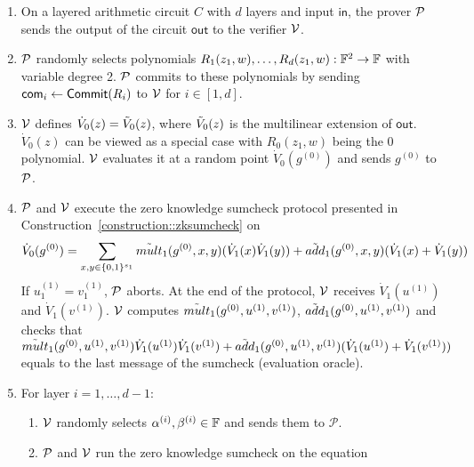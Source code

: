 \begin{mdframed}[nobreak=false]
	\begin{construction}\label{construction:zkgkr}
		\begin{enumerate} 
			\item On a layered arithmetic circuit $C$ with $d$ layers and input $\mathsf{in}$, the prover $\P$ sends the output of the circuit $\mathsf{out}$ to the verifier $\V$.
			
			\item $\P$ randomly selects polynomials $R_1(z_1, w), \ldots, R_d(z_1, w): \F^2\rightarrow \F$ with variable degree 2. $\P$ commits to these polynomials by sending $\comm_i\leftarrow\Commit(R_i)$ to $\V$ for $i\in[1,d]$.
			
			\item $\V$ defines $\dot{V}_0(z)= \tV_0(z)$, where $\tV_0(z)$ is the multilinear extension of $\mathsf{out}$. $\dot{V}_0(z)$ can be viewed as a special case with $R_0(z_1,w)$ being the 0 polynomial. $\V$ evaluates it at a random point $\dot{V}_0(g^{(0)})$ and sends $g^{(0)}$ to $\P$.
			
			\item $\P$ and $\V$ execute the zero knowledge sumcheck protocol presented in Construction~\ref{construction::zksumcheck} on
			\[
			\dot{V}_{0}(g^{(0)})=\sum_{x, y\in \binary^{s_{1}}}\tilde{mult}_{1}(g^{(0)}, x, y)(\dot{V}_{1}(x)\dot{V}_{1}(y))+\tilde{add}_{1}(g^{(0)},x,y)(\dot{V}_{1}(x)+\dot{V}_{1}(y))
			\]
			If $u_1^{(1)} = v_1^{(1)}$, $\P$ aborts. At the end of the protocol, $\V$ receives $\dot{V}_1(u^{(1)})$ and $\dot{V}_1(v^{(1)})$. $\V$ computes $\tmult_1(g^{(0)},u^{(1)},v^{(1)})$, $\tadd_1(g^{(0)},u^{(1)},v^{(1)})$ and checks that $\tmult_1(g^{(0)},u^{(1)},v^{(1)})\dot{V}_1(u^{(1)})\dot{V}_1(v^{(1)})+\tadd_1(g^{(0)},u^{(1)},v^{(1)})(\dot{V}_1(u^{(1)})+\dot{V}_1(v^{(1)}))$ equals to the last message of the sumcheck (evaluation oracle).
			
			\item For layer $i=1,\ldots, d-1$:
			\begin{enumerate}
				\item $\V$ randomly selects $\alpha^{(i)}, \beta^{(i)}\in\F$ and sends them to $\mathcal{P}$.
				\item $\P$ and $\V$ run the zero knowledge sumcheck on the equation\\
				

\end{enumerate}
\end{enumerate}
\end{construction}
\end{mdframed}
